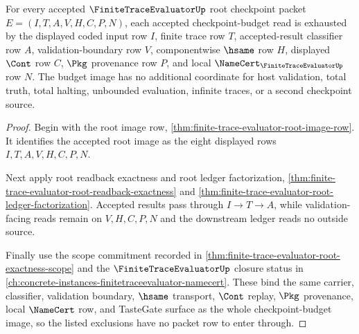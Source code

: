 \begin{theorem}
\label{thm:finite-trace-evaluator-root-checkpoint-budget-image-exhaustion}
For every accepted $\FiniteTraceEvaluatorUp$ root checkpoint packet
$E=(I,T,A,V,H,C,P,N)$, each accepted checkpoint-budget read is exhausted by
the displayed coded input row $I$, finite trace row $T$, accepted-result
classifier row $A$, validation-boundary row $V$, componentwise $\hsame$ row
$H$, displayed $\Cont$ row $C$, $\Pkg$ provenance row $P$, and local
$\NameCert_{\FiniteTraceEvaluatorUp}$ row $N$. The budget image has no
additional coordinate for host validation, total truth, total halting,
unbounded evaluation, infinite traces, or a second checkpoint source.
\end{theorem}
\begin{proof}
Begin with the root image row,
\autoref{thm:finite-trace-evaluator-root-image-row}. It identifies the
accepted root image as the eight displayed rows $I,T,A,V,H,C,P,N$.

Next apply root readback exactness and root ledger factorization,
\autoref{thm:finite-trace-evaluator-root-readback-exactness} and
\autoref{thm:finite-trace-evaluator-root-ledger-factorization}. Accepted
results pass through $I \to T \to A$, while validation-facing reads remain on
$V,H,C,P,N$ and the downstream ledger reads no outside source.

Finally use the scope commitment recorded in
\autoref{thm:finite-trace-evaluator-root-exactness-scope} and the
$\FiniteTraceEvaluatorUp$ closure status in
\autoref{ch:concrete-instances-finitetraceevaluator-namecert}. These bind the
same carrier, classifier, validation boundary, $\hsame$ transport, $\Cont$
replay, $\Pkg$ provenance, local $\NameCert$ row, and TasteGate surface as the
whole checkpoint-budget image, so the listed exclusions have no packet row to
enter through.
\end{proof}

